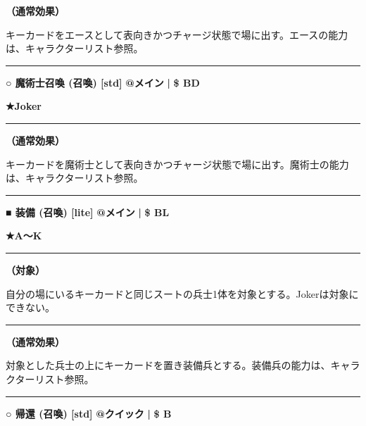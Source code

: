 \documentclass[twocolumn,a5paper,papersize,10pt]{jarticle}
\begin{document}
{\bf（通常効果）}

キーカードをエースとして表向きかつチャージ状態で場に出す。エースの能力は、キャラクターリスト参照。
\vspace{2mm} %
\hrule height 0.5mm depth 0mm width 66.5mm %
\vspace{1mm} %
{\small\bf ○ 魔術士召喚 {\scriptsize (召喚) [std]}} %
\hfill 
{\footnotesize\bf @メイン }
  {\footnotesize\bf | } {\footnotesize\bf \$ BD}

{\footnotesize\bf ★Joker}

\vspace{1mm}%
\hrule height 0.1mm depth 0mm width 66.5mm %
\vspace{1mm}%

{\bf（通常効果）}

キーカードを魔術士として表向きかつチャージ状態で場に出す。魔術士の能力は、キャラクターリスト参照。
\vspace{2mm} %
\hrule height 0.5mm depth 0mm width 66.5mm %
\vspace{1mm} %
{\small\bf ■ 装備 {\scriptsize (召喚) [lite]}} %
\hfill 
{\footnotesize\bf @メイン }
  {\footnotesize\bf | } {\footnotesize\bf \$ BL}

{\footnotesize\bf ★A〜K}

\vspace{1mm}%
\hrule height 0.1mm depth 0mm width 66.5mm %
\vspace{1mm}%
{\bf（対象）}

自分の場にいるキーカードと同じスートの兵士1体を対象とする。Jokerは対象にできない。
\vspace{1mm}%
\hrule height 0.1mm depth 0mm width 66.5mm %
\vspace{1mm}%

{\bf（通常効果）}

対象とした兵士の上にキーカードを置き装備兵とする。装備兵の能力は、キャラクターリスト参照。
\vspace{2mm} %
\hrule height 0.5mm depth 0mm width 66.5mm %
\vspace{1mm} %
{\small\bf ○ 帰還 {\scriptsize (召喚) [std]}} %
\hfill 
{\footnotesize\bf @クイック }
  {\footnotesize\bf | } {\footnotesize\bf \$ B}
\end{document}
